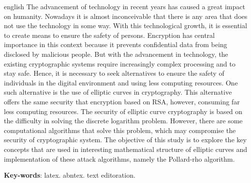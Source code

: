 \begin{resumo}[Abstract]
\begin{otherlanguage*}{english}
The advancement of technology in recent years has caused a great impact on humanity. Nowadays it is almost inconceivable that there is any area that does not use the technology in some way. With this technological growth, it is essential to create means to ensure the safety of persons. Encryption has central importance in this context because it prevents confidential data from being disclosed by malicious people. But with the advancement in technology, the existing cryptographic systems require increasingly complex processing and to stay safe. Hence, it is necessary to seek alternatives to ensure the safety of individuals in the digital environment and using less computing resources. One such alternative is the use of elliptic curves in cryptography. This alternative offers the same security that encryption based on RSA, however, consuming far less computing resources. The security of elliptic curve cryptography is based on the difficulty in solving the discrete logarithm problem. However, there are some computational algorithms that solve this problem, which may compromise the security of cryptographic system. The objective of this study is to explore the key concepts that are used in interesting mathematical structure of elliptic curves and implementation of these attack algorithms, namely the Pollard-rho algorithm.

\vspace{\onelineskip}

\noindent 
\textbf{Key-words}: latex. abntex. text editoration.
\end{otherlanguage*}
\end{resumo}
